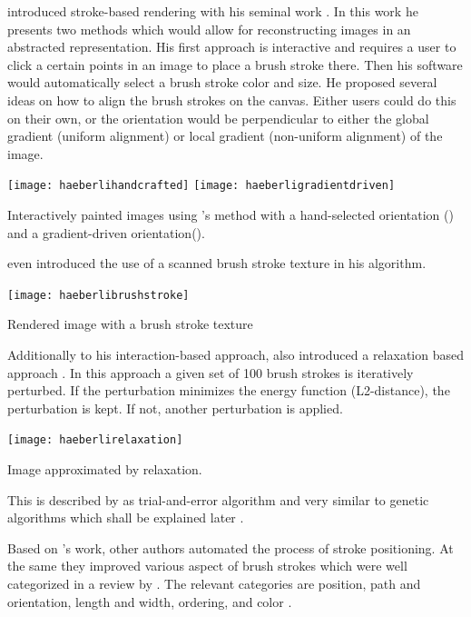 \citeauthor*{paintbynumbers} introduced stroke-based rendering with his seminal work  \cite{paintbynumbers}.
In this work he presents two methods which would allow for reconstructing images in an abstracted representation.
His first approach is interactive and requires a user to click a certain points in an image to place a brush stroke there.
Then his software would automatically select a brush stroke color and size.
He proposed several ideas on how to align the brush strokes on the canvas.
Either users could do this on their own, or the orientation would be perpendicular to either the global gradient (uniform alignment) or local gradient (non-uniform alignment) of the image.
\begin{marginfigure}
    \texttt{[image: haeberlihandcrafted]}
    \texttt{[image: haeberligradientdriven]}
    \caption[]{Interactively painted images using \citeauthor*{paintbynumbers}'s method with a hand-selected orientation () and a gradient-driven orientation().}
\end{marginfigure}
\citeauthor*{paintbynumbers} even introduced the use of a scanned brush stroke texture in his algorithm.
\begin{marginfigure}
    \texttt{[image: haeberlibrushstroke]}
    \caption[]{Rendered image with a brush stroke texture}
\end{marginfigure}

Additionally to his interaction-based approach, \citeauthor*{paintbynumbers} also introduced a relaxation based approach \cite{paintbynumbers}.
In this approach a given set of 100 brush strokes is iteratively perturbed.
If the perturbation minimizes the energy function (L2-distance), the perturbation is kept.
If not, another perturbation is applied.
\begin{marginfigure}
    \texttt{[image: haeberlirelaxation]}
    \caption[]{Image approximated by relaxation.}
\end{marginfigure}
This is described by \citeauthor*{hertzmannreview} as trial-and-error algorithm and very similar to genetic algorithms which shall be explained later \cite{hertzmannreview}.

Based on \citeauthor*{paintbynumbers}'s work, other authors automated the process of stroke positioning.
At the same they improved various aspect of brush strokes which were well categorized in a review by \citeauthor*{PRreview}.
The relevant categories are position, path and orientation, length and width, ordering, and color \cite{PRreview}.

